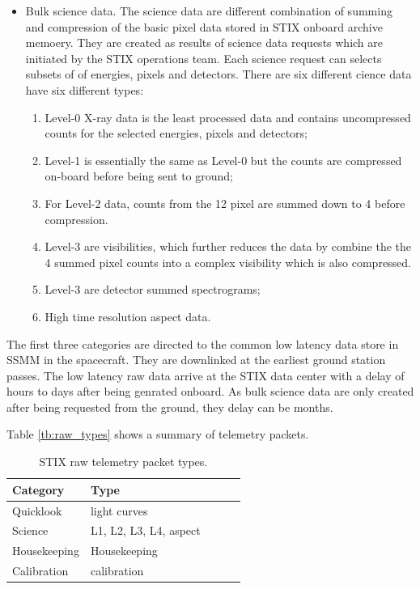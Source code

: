 \documentclass{aa}
\begin{document}
\begin{itemize}
\item
Bulk science data.  The science data are different combination of summing and compression of the basic pixel data stored in STIX onboard archive memoery.
They are created as results of science data requests which are initiated by the STIX operations team.
Each science request can selects subsets of of energies, pixels and detectors.
There are six different cience data have six different types:
\begin{enumerate}
\item Level-0 X-ray data is the least processed data and contains uncompressed counts for the selected energies, pixels and detectors;
\item Level-1 is essentially the same as Level-0 but the counts are compressed on-board before being sent to ground;
\item For Level-2 data,  counts from the 12 pixel are summed down to 4 before compression.
\item Level-3 are visibilities, which further reduces the data by combine the the 4 summed pixel counts into a complex visibility which is also compressed.
\item Level-3 are detector summed spectrograms;
\item High time resolution aspect data.
\end{enumerate}

\end{itemize}
The first three categories are  directed to the
common low latency data store  in SSMM in the spacecraft. They are downlinked
at the earliest ground station passes. The low latency raw data arrive  at the STIX data center with a delay of hours to
days after being genrated onboard.   As bulk science data are only
created  after being requested from the ground, they delay can be
months.

Table \ref{tb:raw_types} shows a summary of telemetry packets.

\begin{table}[h]
\caption{STIX raw telemetry packet types.}
\begin{tabular}{lllll}
\hline
Category & Type & & & \\ \hline
Quicklook    & light curves           &  &  &  \\ \hline
Science      & L1, L2, L3, L4, aspect &  &  &  \\ \hline
Housekeeping & Housekeeping           &  &  &  \\ \hline
Calibration  & calibration            &  &  &  \\ \hline
\end{tabular}
\label{raw_types}
\end{table}
\end{document}
